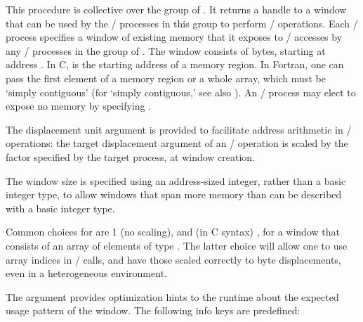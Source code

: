 This procedure is collective over the group of
.  It returns a handle to a window that can be used by the
\mpi/ processes in this group to perform \RMA/ operations.  Each \mpi/ process specifies
a window of existing memory that it exposes to \RMA/ accesses by any \mpi/
processes in the group of
.
The window consists of  bytes,
starting at address .
In C,  is the starting
address of a memory region. 
In Fortran, one can pass the first element of a memory region
or a whole array, which must be `simply contiguous' 
(for `simply contiguous,' see also 
).
An \mpi/ process may elect to expose no memory by
specifying .

The displacement unit argument
is provided to facilitate address arithmetic in \RMA/
operations: the target displacement argument of an \RMA/ operation is
scaled by the factor  specified by the target
process, at window creation.

\begin{rationale}
The window size is specified using an address-sized integer,
rather than a basic integer type, to allow windows that span more memory than
can be described with a basic integer type.
\end{rationale}

\begin{users}
Common choices for 
are 1 (no scaling), and (in C syntax) , for a
window that consists of an array of elements of type .  The
latter
choice will allow one to use array indices in \RMA/ calls,
and have those scaled correctly to byte displacements, even in a
heterogeneous environment.
\end{users}

The  argument provides
optimization hints to the runtime about the expected
usage pattern of the window.
The following info keys are predefined:

